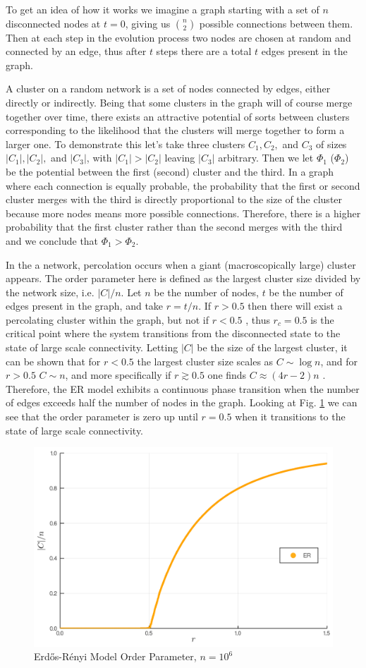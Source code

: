 To get an idea of how it works we imagine a graph starting with a set of $n$ disconnected nodes at $t = 0$, giving us ${n \choose 2}$ possible connections between them.
Then at each step in the evolution process two nodes are chosen at random and connected by an edge, thus after $t$ steps there are a total $t$ edges present in the graph.

A cluster on a random network is a set of nodes connected by edges, either directly or indirectly.
Being that some clusters in the graph will of course merge together over time, there exists an attractive potential of sorts between clusters corresponding to the likelihood that the clusters will merge together to form a larger one.
To demonstrate this let's take three clusters $C_1, C_2,$ and $C_3$ of sizes $|C_1|, |C_2|,$ and $|C_3|$, with $|C_1| > |C_2|$ leaving $|C_3|$ arbitrary.
Then we let $\Phi_1$ ($\Phi_2$) be the potential between the first (second) cluster and the third.
In a graph where each connection is equally probable, the probability that the first or second cluster merges with the third is directly proportional to the size of the cluster because more nodes means more possible connections.
Therefore, there is a higher probability that the first cluster rather than the second merges with the third and we conclude that $\Phi_1 > \Phi_2$.

In the a network, percolation occurs when a giant (macroscopically large) cluster appears.
The order parameter here is defined as the largest cluster size divided by the network size, i.e. $|C| / n$.
Let $n$ be the number of nodes, $t$ be the number of edges present in the graph, and take $r = t/n$.
If $r > 0.5$ then there will exist a percolating cluster within the graph, but not if $r < 0.5$ \cite{ER_2}, thus $r_c = 0.5$ is the critical point where the system transitions from the disconnected state to the state of large scale connectivity.
Letting $|C|$ be the size of the largest cluster, it can be shown that for $r < 0.5$ the largest cluster size scales as $C \sim \log n$, and for $r > 0.5$ $C \sim n$, and more specifically if $r \gtrsim 0.5$ one finds $C \approx (4r - 2)n$ \cite{ER_2}.
Therefore, the ER model exhibits a continuous phase transition when the number of edges exceeds half the number of nodes in the graph.
Looking at Fig. \ref{fig:ER_transition} we can see that the order parameter is zero up until $r = 0.5$ when it transitions to the state of large scale connectivity.

\begin{figure}[H]
	\centering
	\includegraphics[width=350pt]{images/Network_ER_1e6_order_param.png}
	\caption{Erdős-Rényi Model Order Parameter, $n = 10^6$}
	\label{fig:ER_transition}
\end{figure}
